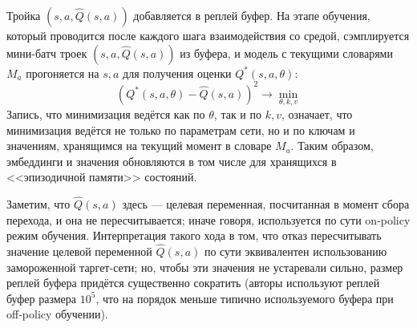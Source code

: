 Тройка $(s, a, \hat{Q}(s, a))$ добавляется в реплей буфер. На этапе обучения, который проводится после каждого шага взаимодействия со средой, сэмплируется мини-батч троек $(s, a, \hat{Q}(s, a))$ из буфера, и модель с текущими словарями $M_a$ прогоняется на $s, a$ для получения оценки $Q^*(s, a, \theta)$:
\begin{equation*}
\left( Q^*(s, a, \theta) - \hat{Q}(s, a)\right)^2 \to \min_{\theta, k, v}
\end{equation*}
Запись, что минимизация ведётся как по $\theta$, так и по $k, v$, означает, что минимизация ведётся не только по параметрам сети, но и по ключам и значениям, хранящимся на текущий момент в словаре $M_a$. Таким образом, эмбеддинги и значения обновляются в том числе для хранящихся в <<эпизодичной памяти>> состояний.

Заметим, что $\hat{Q}(s, a)$ здесь --- целевая переменная, посчитанная в момент сбора перехода, и она не пересчитывается; иначе говоря, используется по сути on-policy режим обучения. Интерпретация такого хода в том, что отказ пересчитывать значение целевой переменной $\hat{Q}(s, a)$ по сути эквивалентен использованию замороженной таргет-сети; но, чтобы эти значения не устаревали сильно, размер реплей буфера придётся существенно сократить (авторы используют реплей буфер размера $10^5$, что на порядок меньше типично используемого буфера при off-policy обучении).